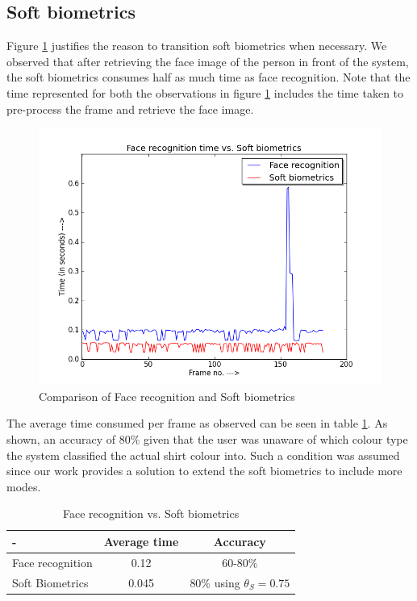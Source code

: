 \documentclass[12pt]{article}			%
\begin{document}
\subsection{Soft biometrics}
Figure \ref{fig:fsoft} justifies the reason to transition soft biometrics when necessary.
We observed that after retrieving the face image of the person in front of the system, the soft biometrics consumes half as much time as face recognition.
Note that the time represented for both the observations in figure \ref{fig:fsoft} includes the time taken to pre-process the frame and retrieve the face image.
\begin{figure}[h!]
	\centering
	\includegraphics[scale=0.40]{img/face_vs_soft.png}
	\caption{Comparison of Face recognition and Soft biometrics}
	\label{fig:fsoft}
\end{figure}
The average time consumed per frame as observed can be seen in table \ref{tab:frsb}.
As shown, an accuracy of 80\% given that the user was unaware of which colour type the system classified the actual shirt colour into.
Such a condition was assumed since our work provides a solution to extend the soft biometrics to include more modes.
\begin{table}[htp]
	\centering
	\caption{Face recognition vs. Soft biometrics}
	\begin{tabular}{||l|c|c||} \hline \hline
	-                  &  Average time  &  Accuracy \\ \hline
	Face recognition   &  0.12          &  60-80\% \\ \hline
	Soft Biometrics    &  0.045         &  80\% using $\theta_{S}=0.75$ \\ \hline \hline
	\end{tabular}
	\label{tab:frsb}
\end{table}
\end{document}
